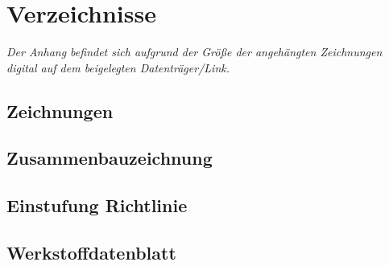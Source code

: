 \documentclass[captions=tableheading, listof=leveldown, 11pt]{scrartcl}
\begin{document}
\section*{Verzeichnisse}
\listoffigures 
\newpage
\listoftables
\newpage
\printbibliography [heading=subbibliography] %
\newpage
\appendix
{}
\textit{Der Anhang befindet sich aufgrund der Größe der angehängten Zeichnungen digital auf dem beigelegten Datenträger/Link.}
\newpage
{}
\subsection{Zeichnungen}
\newpage
\subsection{Zusammenbauzeichnung}
\newpage
\subsection{Einstufung Richtlinie}
\newpage
\subsection{Werkstoffdatenblatt} \label{Anh:datenblatt}
\end{document}
